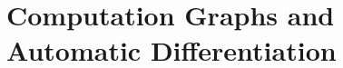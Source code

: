 \textcite{singer2018static}


\section{Computation Graphs and Automatic Differentiation}
\label{sec:graph-track-autom}




